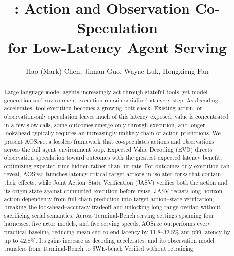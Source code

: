 \documentclass[letterpaper]{article} %
\title{\sysname{}: Action and Observation Co-Speculation\\for Low-Latency Agent Serving}
\author{
    Hao (Mark) Chen, Jinnan Guo, Wayne Luk, Hongxiang Fan
}
\newcommand{\sysname}{\textsc{AOSpec}}
\begin{document}
\maketitle

\begin{abstract}
Large language model agents increasingly act through stateful tools, yet model
generation and environment execution remain serialized at every step. As
decoding accelerates, tool execution becomes a growing bottleneck. Existing
action- or observation-only speculation leaves much of this latency exposed:
value is concentrated in a few slow calls, some outcomes emerge only through
execution, and longer lookahead typically requires an increasingly unlikely
chain of action predictions.
We present \sysname{}, a lossless framework that co-speculates actions and
observations across the full agent--environment loop. Expected Value Decoding
(EVD) directs observation speculation toward outcomes with the greatest
expected latency benefit, optimizing expected time hidden rather than hit
rate. For outcomes only execution can reveal, \sysname{} launches
latency-critical target actions in isolated forks that contain their effects,
while Joint Action--State Verification (JASV) verifies both the action and its
origin state against committed execution before reuse. JASV recasts
long-horizon action dependency from full-chain prediction into target
action--state verification, breaking the lookahead--accuracy tradeoff and
unlocking long-range overlap without sacrificing serial semantics.
Across Terminal-Bench serving settings spanning four harnesses, five actor
models, and five serving speeds, \sysname{} outperforms every practical
baseline, reducing mean end-to-end latency by 11.8--32.5\% and p99 latency by
up to 42.8\%. Its gains increase as decoding accelerates, and its observation
model transfers from Terminal-Bench to SWE-bench Verified without retraining.
\end{abstract}














\end{document}
